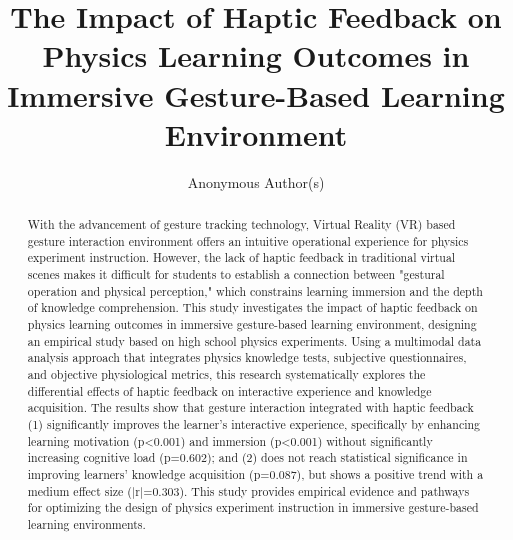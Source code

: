 \documentclass[runningheads]{llncs}
\begin{document}
\title{The Impact of Haptic Feedback on Physics Learning Outcomes in Immersive Gesture-Based Learning Environment}

\author{Anonymous Author(s)}

\maketitle

\begin{abstract}
With the advancement of gesture tracking technology, Virtual Reality (VR) based gesture interaction environment offers an intuitive operational experience for physics experiment instruction. However, the lack of haptic feedback in traditional virtual scenes makes it difficult for students to establish a connection between "gestural operation and physical perception," which constrains learning immersion and the depth of knowledge comprehension. This study investigates the impact of haptic feedback on physics learning outcomes in immersive gesture-based learning environment, designing an empirical study based on high school physics experiments. Using a multimodal data analysis approach that integrates physics knowledge tests, subjective questionnaires, and objective physiological metrics, this research systematically explores the differential effects of haptic feedback on interactive experience and knowledge acquisition. The results show that gesture interaction integrated with haptic feedback (1) significantly improves the learner's interactive experience, specifically by enhancing learning motivation (p<0.001) and immersion (p<0.001) without significantly increasing cognitive load (p=0.602); and (2) does not reach statistical significance in improving learners' knowledge acquisition (p=0.087), but shows a positive trend with a medium effect size (|r|=0.303). This study provides empirical evidence and pathways for optimizing the design of physics experiment instruction in immersive gesture-based learning environments.

\end{abstract}
 
\end{document}
